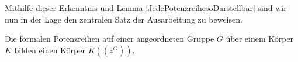 %
%
%
%
%
%
%
%
%
% 
%
%
%
%
%
% 
%
%
%
Mithilfe dieser Erkenntnis und Lemma \ref{JedePotenzreihesoDarstellbar} sind wir nun in der Lage den zentralen Satz der Ausarbeitung zu beweisen.
%
\begin{satz}
Die formalen Potenzreihen auf einer angeordneten Gruppe $G$ über einem Körper $K$ bilden einen Körper $K\left(\left(z^{G}\right)\right)$.
\end{satz}
